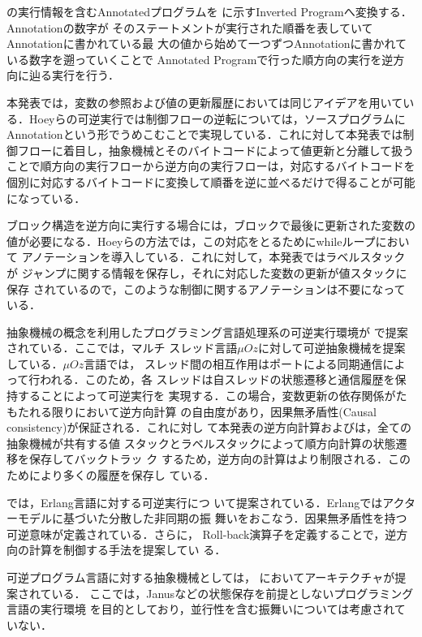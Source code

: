 \documentclass[submit,PRO]{ipsj}
\begin{document}
の実行情報を含むAnnotatedプログラムを
に示すInverted Programへ変換する．Annotationの数字が
そのステートメントが実行された順番を表していてAnnotationに書かれている最
大の値から始めて一つずつAnnotationに書かれている数字を遡っていくことで
Annotated Programで行った順方向の実行を逆方向に辿る実行を行う．

本発表では，変数の参照および値の更新履歴においては同じアイデアを用いてい
る．Hoeyらの可逆実行では制御フローの逆転については，ソースプログラムに
Annotationという形でうめこむことで実現している．これに対して本発表では制
御フローに着目し，抽象機械とそのバイトコードによって値更新と分離して扱う
ことで順方向の実行フローから逆方向の実行フローは，対応するバイトコードを
個別に対応するバイトコードに変換して順番を逆に並べるだけで得ることが可能
になっている．

ブロック構造を逆方向に実行する場合には，ブロックで最後に更新された変数の
値が必要になる．Hoeyらの方法では，この対応をとるためにwhileループにおいて
アノテーションを導入している．これに対して，本発表ではラベルスタックが
ジャンプに関する情報を保存し，それに対応した変数の更新が値スタックに保存
されているので，このような制御に関するアノテーションは不要になっている．

抽象機械の概念を利用したプログラミング言語処理系の可逆実行環境が
\cite{DBLP:conf/forte/LienhardtLMS12}で提案されている．ここでは，マルチ
スレッド言語$\mu Oz$に対して可逆抽象機械を提案している．$\mu Oz$言語では，
スレッド間の相互作用はポートによる同期通信によって行われる．このため，各
スレッドは自スレッドの状態遷移と通信履歴を保持することによって可逆実行を
実現する．この場合，変数更新の依存関係がたもたれる限りにおいて逆方向計算
の自由度があり，因果無矛盾性(Causal consistency)が保証される．これに対し
て本発表の逆方向計算および\cite{Hoey20PHD}は，全ての抽象機械が共有する値
スタックとラベルスタックによって順方向計算の状態遷移を保存してバックトラッ
ク
\cite{DBLP:journals/software/AgrawalDS91,DBLP:journals/corr/abs-1709-00828}
するため，逆方向の計算はより制限される．このためにより多くの履歴を保存し
ている．

\cite{DBLP:journals/jlp/LaneseNPV18}では，Erlang言語に対する可逆実行につ
いて提案されている．Erlangではアクターモデルに基づいた分散した非同期の振
舞いをおこなう．因果無矛盾性を持つ可逆意味が定義されている．さらに，
Roll-back演算子を定義することで，逆方向の計算を制御する手法を提案してい
る．

可逆プログラム言語に対する抽象機械としては，
\cite{DBLP:conf/csr/AxelsenGY07}においてアーキテクチャが提案されている．
ここでは，Janusなどの状態保存を前提としないプログラミング言語の実行環境
を目的としており，並行性を含む振舞いについては考慮されていない．
\end{document}
